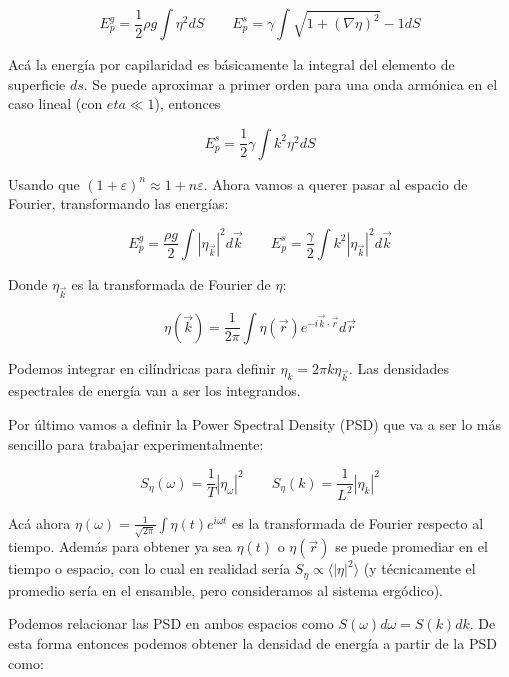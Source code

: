\begin{equation}
	E_p^g = \frac{1}{2} \rho g \int \eta^2 dS \qquad E_p^s = \gamma \int\sqrt{1+(\nabla\eta)^2} - 1 dS
\end{equation}

Acá la energía por capilaridad es básicamente la integral del elemento de superficie $ds$. Se puede aproximar a primer orden para una onda armónica en el caso lineal (con $eta\ll1$), entonces \cite{deikeEtudesExperimentalesNumeriques2013}

\begin{equation}
	E_p^s = \frac{1}{2} \gamma\int k^2\eta^2dS
\end{equation}

Usando que $(1+\varepsilon)^n\approx1+n\varepsilon$. Ahora vamos a querer pasar al espacio de Fourier, transformando las energías:

\begin{equation}
	E_p^g = \frac{\rho g}{2} \int |\eta_{\vec k}|^2d\vec k \qquad E_p^s = \frac{\gamma}{2} \int k^2|\eta_{\vec k}|^2d\vec k
\end{equation}

Donde $\eta_{\vec k}$ es la transformada de Fourier de $\eta$:

\begin{equation}
	\eta(\vec k) = \frac{1}{2\pi}\int\eta(\vec r)e^{-i\vec k\cdot\vec r} d\vec r
\end{equation}

Podemos integrar en cilíndricas para definir $\eta_k = 2\pi k\eta_{\vec k}$. Las densidades espectrales de energía van a ser los integrandos. 

Por último vamos a definir la Power Spectral Density (PSD) que va a ser lo más sencillo para trabajar experimentalmente:

\begin{equation}
	S_\eta(\omega) = \frac{1}{T} |\eta_\omega|^2 \qquad S_\eta(k) = \frac{1}{L^2} |\eta_k|^2
\end{equation}

Acá ahora $\eta(\omega) = \frac{1}{\sqrt{2\pi}}\int\eta(t)e^{i\omega t}$ es la transformada de Fourier respecto al tiempo. Además para obtener ya sea $\eta(t)$ o $\eta(\vec r)$ se puede promediar en el tiempo o espacio, con lo cual en realidad sería $S_\eta\propto\langle |\eta|^2 \rangle$ (y técnicamente el promedio sería en el ensamble, pero consideramos al sistema ergódico). \cite{falconExperimentsSurfaceGravity2022}

Podemos relacionar las PSD en ambos espacios como $S(\omega)d\omega=S(k)dk$. De esta forma entonces podemos obtener la densidad de energía a partir de la PSD como:

